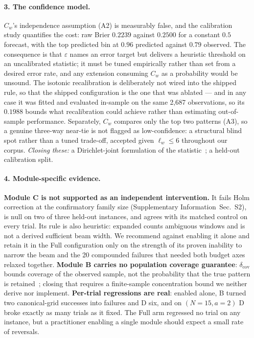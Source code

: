 \documentclass[preprint,11pt]{elsarticle}
\newcommand{\SI}{Supplementary Information}
\newcommand{\SItables}{\SI{}~Sec.~S2}
\newcommand{\Cw}{C_w}
\newcommand{\dcov}{\delta_{\mathrm{cov}}}
\begin{document}
\paragraph{3. The confidence model.}
$\Cw$'s independence assumption (A2) is measurably false, and the
calibration study quantifies the cost: raw Brier $0.2239$ against
$0.2500$ for a constant $0.5$ forecast, with the top predicted bin at
$0.96$ predicted against $0.79$ observed. The consequence is that
$\varepsilon$ names an error target but delivers a heuristic threshold on
an uncalibrated statistic; it must be tuned empirically rather than set
from a desired error rate, and any extension consuming $\Cw$ as a
probability would be unsound. The isotonic recalibration is deliberately
not wired into the shipped rule, so that the shipped configuration is the
one that was ablated --- and in any case it was fitted and evaluated
in-sample on the same 2{,}687 observations, so its $0.1988$ bounds what
recalibration could achieve rather than estimating out-of-sample
performance. Separately, $\Cw$ compares only the top two patterns (A3),
so a genuine three-way near-tie is not flagged as low-confidence: a
structural blind spot rather than a tuned trade-off, accepted given
$\ell_w\le6$ throughout our corpus. \emph{Closing these:} a
Dirichlet-joint formulation of the statistic~\cite{methodpaper}; a
held-out calibration split.

\paragraph{4. Module-specific evidence.}
\textbf{Module C is not supported as an independent intervention.} It
fails Holm correction at the confirmatory family size
(\SItables{}), is null on two of three held-out instances, and
agrees with its matched control on every trial. Its rule is also
heuristic: $\mathrm{expanded}$ counts ambiguous windows and is not a
derived sufficient beam width. We recommend against enabling it alone and
retain it in the Full configuration only on the strength of its proven
inability to narrow the beam and the 20 compounded failures that needed
both budget axes relaxed together. \textbf{Module B carries no population
coverage guarantee}: $\dcov$ bounds coverage of the observed sample, not
the probability that the true pattern is retained~\cite{methodpaper}; closing that requires a finite-sample
concentration bound we neither derive nor implement. \textbf{Per-trial
regressions are real}: enabled alone, B turned two canonical-grid
successes into failures and D six, and on $(N{=}15,a{=}2)$ D broke
exactly as many trials as it fixed. The Full arm regressed no trial on
any instance, but a practitioner enabling a single module should expect a
small rate of reversals.
\end{document}
